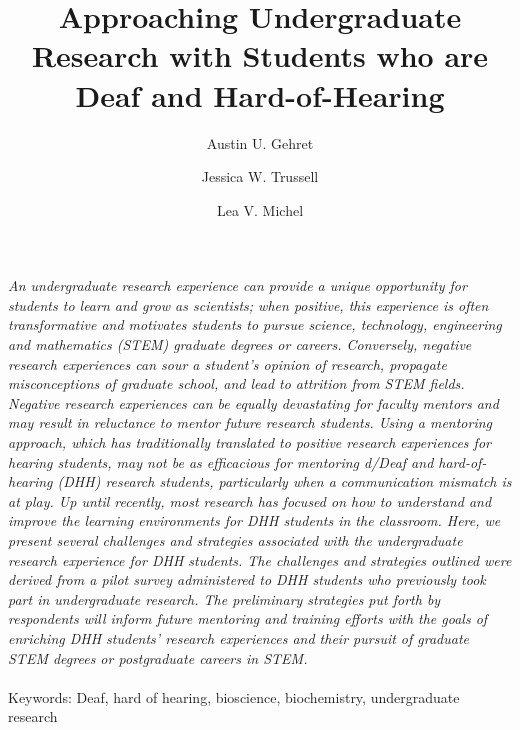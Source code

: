\documentclass[11.5pt]{sig-alternate} %
\makeatletter
\let\oldabstract\abstract
\let\oldendabstract\endabstract
\renewenvironment{abstract} %
{\renewenvironment{quotation}%
               {\list{}{\addtolength{\leftmargin}{1em} %
                        \listparindent 1.5em%
                        \itemindent    \listparindent%
                        \rightmargin   \leftmargin%
                        \parsep        \z@ \@plus\p@}%
                \item\relax}%
               {\endlist}%
\oldabstract}
{\oldendabstract}
\makeatother
\begin{document}
\title{Approaching Undergraduate Research with Students who are Deaf and Hard-of-Hearing}

\author[1]{\large \color{blue}Austin U. Gehret}
\author[1]{\large \color{blue}Jessica W. Trussell}
\author[1]{\large \color{blue}Lea V. Michel}

\toappear{}
\maketitle
\begin{@twocolumnfalse} 
\begin{abstract}
\item 
\textit{An undergraduate research experience can provide a unique opportunity for students to learn and grow as scientists; when positive, this experience is often transformative and motivates students to pursue science, technology, engineering and mathematics (STEM) graduate degrees or careers. Conversely, negative research experiences can sour a student’s opinion of research, propagate misconceptions of graduate school, and lead to attrition from STEM fields. Negative research experiences can be equally devastating for faculty mentors and may result in reluctance to mentor future research students. Using a mentoring approach, which has traditionally translated to positive research experiences for hearing students, may not be as efficacious for mentoring d/Deaf and hard-of-hearing (DHH) research students, particularly when a communication mismatch is at play. Up until recently, most research has focused on how to understand and improve the learning environments for DHH students in the classroom. Here, we present several challenges and strategies associated with the undergraduate research experience for DHH students. The challenges and strategies outlined were derived from a pilot survey administered to DHH students who previously took part in undergraduate research. The preliminary strategies put forth by respondents will inform future mentoring and training efforts with the goals of enriching DHH students’ research experiences and their pursuit of graduate STEM degrees or postgraduate careers in STEM.}
\\ \\
Keywords: Deaf, hard of hearing, bioscience, biochemistry, undergraduate research
\end{abstract}
\end{@twocolumnfalse}

\end{document}
